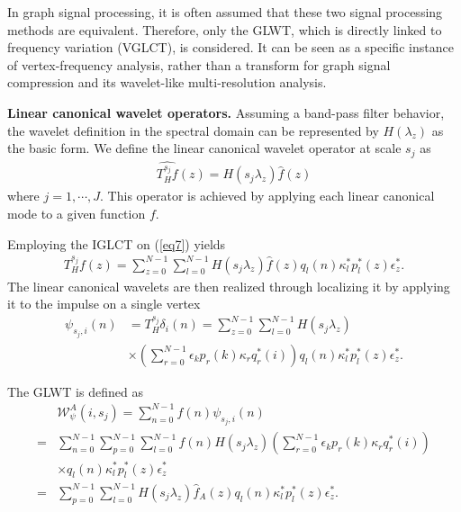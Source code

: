 \documentclass[lettersize,journal]{IEEEtran}
\begin{document}
In graph signal processing, it is often assumed that these two signal processing methods are equivalent. Therefore, only the GLWT, which is directly linked to frequency variation (VGLCT), is considered. It can be seen as a specific instance of vertex-frequency analysis, rather than a transform for graph signal compression and its wavelet-like multi-resolution analysis.

\textbf{Linear canonical wavelet operators.} 
Assuming a band-pass filter behavior, the wavelet definition in the spectral domain can be represented by $H(\lambda_z)$ as the basic form. We define the linear canonical wavelet operator at scale $s_j$ as 
\begin{align}
	\label{eq7}
	\widehat{T^{s_j}_Hf}(z)=H(s_j\lambda_z)\hat{f}(z)
\end{align}
where $j=1,\cdots,J$.
This operator is achieved by applying each linear canonical mode to a given function $f$.

Employing the IGLCT on (\ref{eq7}) yields
\begin{align}
	T_H^{s_j}f(z)= \sum_{z=0}^{N-1} \sum_{l=0}^{N-1} H(s_j\lambda_z)\hat{f}(z)
	q_l(n) \kappa_l^{*} p_l^*(z) \epsilon_z^{*}.
\end{align}
The linear canonical wavelets are then realized through localizing it by applying it to the impulse on a single vertex
\begin{align}
	\psi_{s_j,i}(n)
	& =T_H^{s_j}\delta_i(n)
	=\sum_{z=0}^{N-1} \sum_{l=0}^{N-1} H(s_j\lambda_z)
	 \nonumber \\
	&\times \left(\sum_{r=0}^{N-1}\epsilon_k p_r(k) \kappa_r q_r^*(i)\right) q_l(n) \kappa_l^{*} p_l^*(z) \epsilon_z^{*}.
\end{align}

The GLWT is defined as
\begin{align}
	&\mathcal{W}_{\psi}^A(i,s_j)=\sum_{n=0}^{N-1} f(n)\psi_{s_j,i}(n) \nonumber \\
	=&\sum_{n=0}^{N-1} \sum_{p=0}^{N-1} \sum_{l=0}^{N-1} 
	 f(n)  H(s_j\lambda_z)
	\left(\sum_{r=0}^{N-1}\epsilon_k p_r(k) \kappa_r q_r^*(i)\right) \nonumber \\
	&\times q_l(n) \kappa_l^{*} p_l^*(z) \epsilon_z^{*} \nonumber \\
	=&  \sum_{p=0}^{N-1} \sum_{l=0}^{N-1} H(s_j\lambda_z)\hat{f}_A(z) q_l(n) \kappa_l^{*} p_l^*(z) \epsilon_z^{*}.
\end{align}
\end{document}
